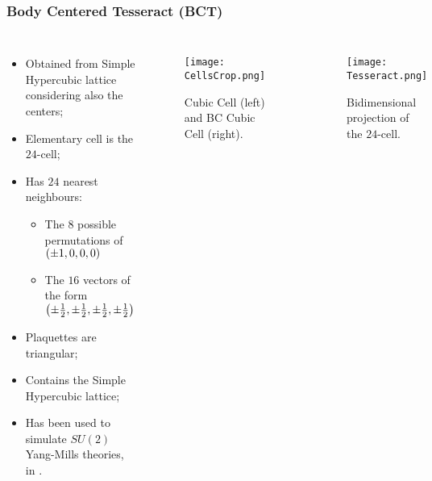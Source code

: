 \documentclass{beamer}
\begin{document}
\begin{frame}
  \frametitle{Body Centered Tesseract (BCT)}
  \centering
  \begin{columns}
    \begin{itemize}
      \item<1->[\ding{228}] Obtained from Simple Hypercubic lattice considering also the centers;
      \item<2->[\ding{228}] Elementary cell is the $24$-cell;
      \item<3->[\ding{228}] Has $24$ nearest neighbours:
      \begin{itemize}
        \item<3-> The $8$ possible permutations of $\left(\pm1,0,0,0\right)$
        \item<3-> The $16$ vectors of the form $\left(\pm\frac12,\pm\frac12,\pm\frac12,\pm\frac12\right)$
      \end{itemize}
      \vspace{0.25\baselineskip}
      \item<4->[\ding{228}] Plaquettes are triangular;
      \item<5->[\ding{228}] Contains the Simple Hypercubic lattice;
      \item<6->[\ding{228}] Has been used to simulate $\mathit{SU}(2)$ Yang-Mills theories,\\in {}.
    \end{itemize}

  \centering
{}
    \begin{figure}
      \texttt{[image: CellsCrop.png]}
      \caption{Cubic Cell (left) and BC Cubic Cell (right).}
    \end{figure}
    \vspace{-\baselineskip}
    \begin{figure}
      \texttt{[image: Tesseract.png]}
      \caption{Bidimensional projection of the $24$-cell.}
    \end{figure}
  \end{columns}
\end{frame}
\end{document}
